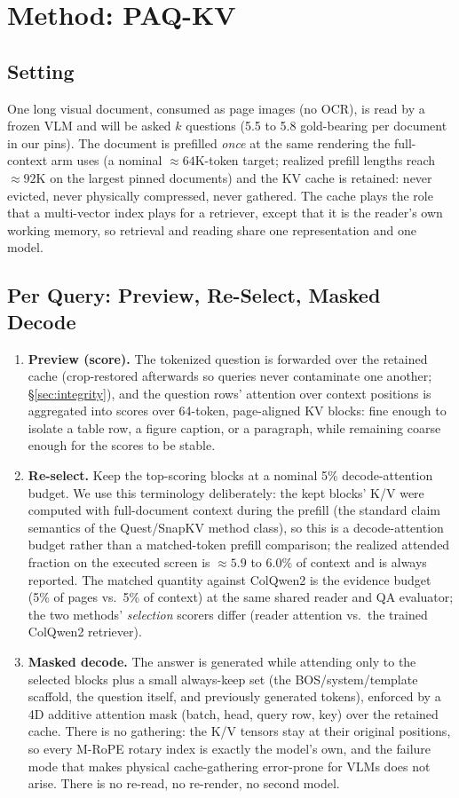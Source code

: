 \documentclass[letterpaper]{article} %
\newcommand{\paqc}{\textsc{PAQ-KV}}
\begin{document}
\section{Method: \paqc{}}\label{sec:method}

\subsection{Setting}
One long visual document, consumed as page images (no OCR), is read by a frozen VLM and will be asked $k$ questions (5.5 to 5.8 gold-bearing per document in our pins). The document is prefilled \emph{once} at the same rendering the full-context arm uses (a nominal ${\approx}64$K-token target; realized prefill lengths reach ${\approx}92$K on the largest pinned documents) and the KV cache is retained: never evicted, never physically compressed, never gathered. The cache plays the role that a multi-vector index plays for a retriever, except that it is the reader's own working memory, so retrieval and reading share one representation and one model.

\subsection{Per Query: Preview, Re-Select, Masked Decode}
\begin{enumerate}
\item \textbf{Preview (score).} The tokenized question is forwarded over the retained cache (crop-restored afterwards so queries never contaminate one another; \S\ref{sec:integrity}), and the question rows' attention over context positions is aggregated into scores over 64-token, page-aligned KV blocks: fine enough to isolate a table row, a figure caption, or a paragraph, while remaining coarse enough for the scores to be stable.
\item \textbf{Re-select.} Keep the top-scoring blocks at a nominal 5\% decode-attention budget. We use this terminology deliberately: the kept blocks' K/V were computed with full-document context during the prefill (the standard claim semantics of the Quest/SnapKV method class), so this is a decode-attention budget rather than a matched-token prefill comparison; the realized attended fraction on the executed screen is ${\approx}5.9$ to $6.0\%$ of context and is always reported. The matched quantity against ColQwen2 is the evidence budget (5\% of pages vs.\ 5\% of context) at the same shared reader and QA evaluator; the two methods' \emph{selection} scorers differ (reader attention vs.\ the trained ColQwen2 retriever).
\item \textbf{Masked decode.} The answer is generated while attending only to the selected blocks plus a small always-keep set (the BOS/system/template scaffold, the question itself, and previously generated tokens), enforced by a 4D additive attention mask (batch, head, query row, key) over the retained cache. There is no gathering: the K/V tensors stay at their original positions, so every M-RoPE rotary index is exactly the model's own, and the failure mode that makes physical cache-gathering error-prone for VLMs does not arise. There is no re-read, no re-render, no second model.
\end{enumerate}
\end{document}
